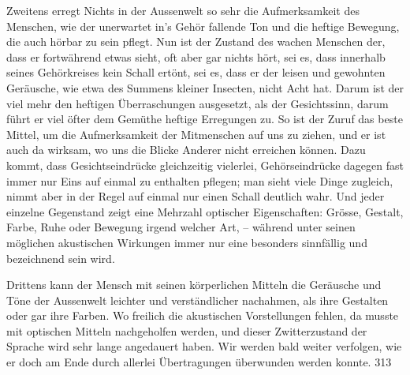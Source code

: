 Zweitens erregt Nichts in der Aussenwelt so sehr die Aufmerksamkeit des Menschen, wie der unerwartet in’s Gehör fallende Ton und die heftige Bewegung, die auch hörbar zu sein pflegt. Nun ist der Zustand des wachen Menschen der, dass er fortwährend etwas sieht, oft aber gar nichts hört, sei es, dass innerhalb seines Gehörkreises kein Schall ertönt, sei es, dass er der leisen und  gewohnten Geräusche, wie etwa des Summens kleiner Insecten, nicht Acht hat. Darum ist der  \label{fp.303} viel mehr den heftigen Überraschungen ausgesetzt, als der Gesichtssinn, darum führt er viel öfter dem Gemüthe heftige Erregungen zu. So ist der Zuruf das beste Mittel, um die Aufmerksamkeit der Mitmenschen auf uns zu ziehen, und er ist auch da wirksam, wo uns die Blicke Anderer nicht erreichen können. Dazu kommt, dass Gesichtseindrücke gleichzeitig vielerlei, Gehörseindrücke dagegen fast immer nur Eins auf einmal zu enthalten pflegen; man sieht viele Dinge zugleich, nimmt aber in der Regel auf einmal nur einen Schall deutlich wahr. Und jeder einzelne Gegenstand zeigt eine Mehrzahl optischer Eigenschaften: Grösse, Gestalt, Farbe, Ruhe oder Bewegung irgend welcher Art, – während unter seinen möglichen akustischen Wirkungen immer nur eine besonders sinnfällig und bezeichnend sein wird.

Drittens kann der Mensch mit seinen körperlichen Mitteln die Geräusche und Töne der Aussenwelt leichter und verständlicher nachahmen, als ihre Gestalten oder gar ihre Farben. Wo freilich die akustischen Vorstellungen fehlen, da musste mit optischen Mitteln nachgeholfen werden, und dieser Zwitterzustand der Sprache wird sehr lange angedauert haben. Wir werden bald weiter verfolgen, wie er doch am Ende durch allerlei Übertragungen überwunden werden konnte.  {\textbar}{\textbar}313{\textbar}{\textbar}\label{sp.313} 

